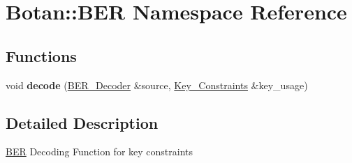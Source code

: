 \hypertarget{namespaceBotan_1_1BER}{\section{Botan\-:\-:B\-E\-R Namespace Reference}
\label{namespaceBotan_1_1BER}
}
\subsection*{Functions}
\begin{DoxyCompactItemize}
\item 
\hypertarget{namespaceBotan_1_1BER_adbb783ccec775f26a581a9bc3a6ec77a}{void {\bfseries decode} (\hyperlink{classBotan_1_1BER__Decoder}{B\-E\-R\-\_\-\-Decoder} \&source, \hyperlink{namespaceBotan_aed0885e5c70627dd43827b966e727654}{Key\-\_\-\-Constraints} \&key\-\_\-usage)}\label{namespaceBotan_1_1BER_adbb783ccec775f26a581a9bc3a6ec77a}

\end{DoxyCompactItemize}


\subsection{Detailed Description}
\hyperlink{namespaceBotan_1_1BER}{B\-E\-R} Decoding Function for key constraints 